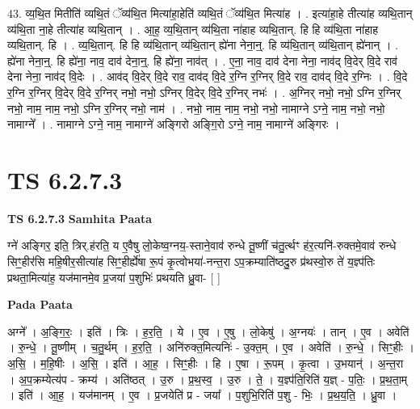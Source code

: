 \documentclass[17pt]{extarticle}
\begin{document}
43. व्य॒थि॒त मितीति॑ व्यथि॒तं ॅव्य॑थि॒त मित्या॑हा॒हेति॑ व्यथि॒तं ॅव्य॑थि॒त मित्या॑ह । . इत्या॑हा॒हे तीत्या॑ह व्यथि॒तान् व्य॑थि॒ता ना॒हे तीत्या॑ह व्यथि॒तान् । . आ॒ह॒ व्य॒थि॒तान् व्य॑थि॒ता ना॑हाह व्यथि॒तान्. हि हि व्य॑थि॒ता ना॑हाह व्यथि॒तान्. हि । . व्य॒थि॒तान्. हि हि व्य॑थि॒तान् व्य॑थि॒तान् ह्ये॑ना नेना॒न्॒. हि व्य॑थि॒तान् व्य॑थि॒तान् ह्ये॑नान् । . ह्ये॑ना नेना॒न्॒. हि ह्ये॑ना॒ नाव॒ दाव॑ देना॒न्॒. हि ह्ये॑ना॒ नाव॑त् । . ए॒ना॒ नाव॒ दाव॑ देना नेना॒ नाव॑द् वि॒देर् वि॒दे राव॑ देना नेना॒ नाव॑द् वि॒देः । . आव॑द् वि॒देर् वि॒दे राव॒ दाव॑द् वि॒दे र॒ग्नि र॒ग्निर् वि॒दे राव॒ दाव॑द् वि॒दे र॒ग्निः । . वि॒दे र॒ग्नि र॒ग्निर् वि॒देर् वि॒दे र॒ग्निर् नभो॒ नभो॒ ऽग्निर् वि॒देर् वि॒दे र॒ग्निर् नभः॑ । . अ॒ग्निर् नभो॒ नभो॒ ऽग्नि र॒ग्निर् नभो॒ नाम॒ नाम॒ नभो॒ ऽग्नि र॒ग्निर् नभो॒ नाम॑ । . नभो॒ नाम॒ नाम॒ नभो॒ नभो॒ नामाग्ने ऽग्ने॒ नाम॒ नभो॒ नभो॒ नामाग्ने᳚ । . नामाग्ने ऽग्ने॒ नाम॒ नामाग्ने॑ अङ्गिरो अङ्गि॒रो ऽग्ने॒ नाम॒ नामाग्ने॑ अङ्गिरः । \newline
\pagebreak
{}

\section{ TS 6.2.7.3 }

\textbf{TS 6.2.7.3 } \newline
\textbf{Samhita Paata} \newline

ग्ने॑ अङ्गिर॒ इति॒ त्रिर्.ह॑रति॒ य ए॒वैषु लो॒केष्व॒ग्नय॒-स्ताने॒वाव॑ रुन्धे तू॒ष्णीं च॑तु॒र्त्थꣳ ह॑र॒त्यनि॑-रुक्तमे॒वाव॑ रुन्धे सिꣳ॒॒हीर॑सि महि॒षीर॒सीत्या॑ह सिꣳ॒॒हीर्ह्ये॑षा रू॒पं कृ॒त्वोभया॑-नन्त॒रा ऽप॒क्रम्याति॑ष्ठदु॒रु प्र॑थस्वो॒रु ते॑ य॒ज्ञ्प॑तिः प्रथता॒मित्या॑ह॒ यज॑मानमे॒व प्र॒जया॑ प॒शुभिः॑ प्रथयति ध्रु॒वा- [  ] \newline

\textbf{Pada Paata} \newline

अग्ने᳚ । अ॒ङ्गि॒रः॒ । इति॑ । त्रिः । ह॒र॒ति॒ । ये । ए॒व । ए॒षु । लो॒केषु॑ । अ॒ग्नयः॑ । तान् । ए॒व । अवेति॑ । रु॒न्धे॒ । तू॒ष्णीम् । च॒तु॒र्थम् । ह॒र॒ति॒ । अनि॑रुक्त॒मित्यनिः॑ - उ॒क्त॒म् । ए॒व । अवेति॑ । रु॒न्धे॒ । सिꣳ॒॒हीः । अ॒सि॒ । म॒हि॒षीः । अ॒सि॒ । इति॑ । आ॒ह॒ । सिꣳ॒॒हीः । हि । ए॒षा । रू॒पम् । कृ॒त्वा । उ॒भयान्॑ । अ॒न्त॒रा । अ॒प॒क्रम्येत्य॑प - क्रम्य॑ । अति॑ष्ठत् । उ॒रु । प्र॒थ॒स्व॒ । उ॒रु । ते॒ । य॒ज्ञ्प॑ति॒रिति॑ य॒ज्ञ् - प॒तिः॒ । प्र॒थ॒ता॒म् । इति॑ । आ॒ह॒ । यज॑मानम् । ए॒व । प्र॒जयेति॑ प्र - जया᳚ । प॒शुभि॒रिति॑ प॒शु - भिः॒ । प्र॒थ॒य॒ति॒ । ध्रु॒वा ।  \newline
\end{document}
